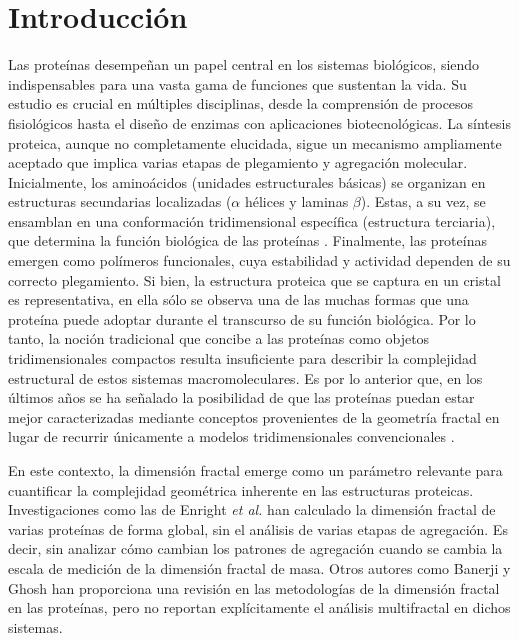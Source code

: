 

\chapter{Introducci\'{o}n}
\label{chap:intro}

Las proteínas desempeñan un papel central en los sistemas biológicos, siendo indispensables para una vasta gama de funciones que sustentan la vida. Su estudio es crucial en múltiples disciplinas, desde la comprensión de procesos fisiológicos hasta el diseño de enzimas con aplicaciones biotecnológicas. La síntesis proteica, aunque no completamente elucidada, sigue un mecanismo ampliamente aceptado que implica varias etapas de plegamiento y agregación molecular. Inicialmente, los aminoácidos (unidades estructurales básicas) se organizan en estructuras secundarias localizadas ($\alpha$ hélices y laminas $\beta$). Estas, a su vez, se ensamblan en una conformación tridimensional específica (estructura terciaria), que determina la función biológica de las proteínas \cite{Hardin2022}. Finalmente, las proteínas emergen como polímeros funcionales, cuya estabilidad y actividad dependen de su correcto plegamiento. Si bien, la estructura proteica que se captura en un cristal es representativa, en ella s\'{o}lo se observa una de las muchas formas que una prote\'{i}na puede adoptar durante el transcurso de su funci\'{o}n biol\'{o}gica. Por lo tanto, la noci\'{o}n tradicional que concibe a las prote\'{i}nas como objetos tridimensionales compactos resulta insuficiente para describir la complejidad estructural de estos sistemas macromoleculares. Es por lo anterior que, en los \'{u}ltimos años se ha señalado la posibilidad de que las prote\'{i}nas puedan estar mejor caracterizadas mediante conceptos provenientes de la geometr\'{i}a fractal en lugar de recurrir \'{u}nicamente a modelos tridimensionales convencionales \cite{Dewey1997, Mustafa1996, Vicsek1992, Cserzo1991}.

En este contexto, la dimensi\'{o}n fractal emerge como un par\'{a}metro relevante para cuantificar la complejidad geom\'{e}trica inherente en las estructuras proteicas. Investigaciones como las de Enright \textit{et al.} \cite{Enright2005} han calculado la dimensi\'{o}n fractal de varias prote\'{i}nas de forma global, sin el an\'{a}lisis de varias etapas de agregaci\'{o}n. Es decir, sin analizar c\'{o}mo cambian los patrones de agregaci\'{o}n cuando se cambia la escala de medici\'{o}n de la dimensi\'{o}n fractal de masa. Otros autores como Banerji y Ghosh \cite{Banerji2011} han proporciona una revisión en las metodologías de la dimensión fractal en las proteínas, pero no reportan explícitamente el análisis multifractal en dichos sistemas. 


